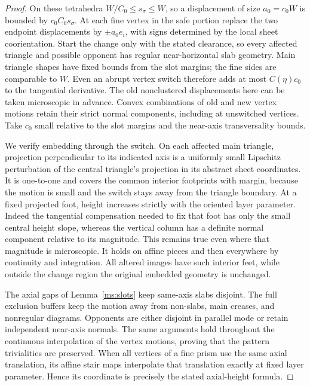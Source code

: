 \documentclass[11pt]{article}
\numberwithin{equation}{section}
\theoremstyle{definition}
\theoremstyle{remark}
\begin{document}
\begin{proof}
On these tetrahedra $W/C_0\le s_\sigma\le W$, so a displacement
of size $a_0=c_0W$ is bounded by $c_0C_0s_\sigma$.
At each fine vertex in the safe portion replace the two endpoint
displacements by $\pm a_0e_i$, with signs determined by the local
sheet coorientation.  Start the change only with the stated
clearance, so every affected triangle and possible opponent has
regular near-horizontal slab geometry.  Main triangle shapes
have fixed bounds from the slot margins; the fine sides are
comparable to $W$.  Even an abrupt vertex switch therefore adds
at most $C(\eta)c_0$ to the tangential derivative.  The old
nonclustered displacements here can be taken microscopic in
advance.  Convex combinations of old and new vertex motions
retain their strict normal components, including at unswitched
vertices.  Take $c_0$ small relative to the slot margins and the
near-axis transversality bounds.

We verify embedding through the switch.  On each affected main
triangle, projection perpendicular to its indicated axis is a
uniformly small Lipschitz perturbation of the central triangle's
projection in its abstract sheet coordinates.  It is one-to-one
and covers the common interior footprints with margin, because
the motion is small and the switch stays away from the triangle
boundary.  At a fixed projected foot, height increases strictly
with the oriented layer parameter.  Indeed the tangential
compensation needed to fix that foot has only the small central
height slope, whereas the vertical column has a definite normal
component relative to its magnitude.  This remains true even
where that magnitude is microscopic.  It holds on affine pieces
and then everywhere by continuity and integration.  All altered
images have such interior feet, while outside the change region
the original embedded geometry is unchanged.

The axial gaps of Lemma~\ref{ms:slots} keep same-axis slabs disjoint.
The full exclusion buffers keep the motion away from non-slabs,
main creases, and nonregular diagrams.  Opponents are either
disjoint in parallel mode or retain independent near-axis
normals.  The same arguments hold throughout the continuous
interpolation of the vertex motions, proving that the pattern
trivialities are preserved.  When all vertices of a fine prism
use the same axial translation, its affine stair maps interpolate
that translation exactly at fixed layer parameter.  Hence its
coordinate is precisely the stated axial-height formula.
\end{proof}
\end{document}
